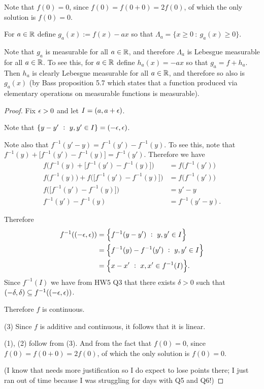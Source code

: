 Note that $f(0) = 0$, since $f(0) = f(0 + 0) = 2f(0)$, of which the only solution is $f(0) = 0$.

For $a \in \mathbb{R}$ define $g_a(x) := f(x) - ax$ so that $\Lambda_a = \{x \geq 0 ~:~ g_a(x) \geq 0\}$.

Note that $g_a$ is measurable for all $a \in \mathbb{R}$, and therefore $\Lambda_a$ is Lebesgue measurable for
all $a \in \mathbb{R}$. To see this, for $a \in \mathbb{R}$ define $h_a(x) = -ax$ so that $g_a = f + h_a$. Then $h_a$ is
clearly Lebesgue measurable for all $a \in \mathbb{R}$, and therefore so also is $g_a(x)$ (by Bass proposition 5.7
which states that a function produced via elementary operations on measurable functions is measurable).

\begin{proof}
  Fix $\epsilon > 0$ and let $I = (a, a + \epsilon)$.

  Note that $\{y - y' ~:~ y, y' \in I\} = (-\epsilon, \epsilon)$.

  Note also that $f^{-1}(y' - y) = f^{-1}(y') - f^{-1}(y)$. To see this, note
  that $f^{-1}(y) + \big[f^{-1}(y') - f^{-1}(y)\big] = f^{-1}(y')$. Therefore we have
  \begin{align*}
    f\Big(f^{-1}(y) + \big[f^{-1}(y') - f^{-1}(y)\big]\Big) &= f\big(f^{-1}(y')\big) \\
    f\Big(f^{-1}(y)\Big) + f\Big(\big[f^{-1}(y') - f^{-1}(y)\big]\Big) &= f\big(f^{-1}(y')\big) \\
    f\Big(\big[f^{-1}(y') - f^{-1}(y)\big]\Big) &= y' - y \\
    f^{-1}(y') - f^{-1}(y) &= f^{-1}(y' - y).
  \end{align*}

  Therefore
  \begin{align*}
    f^{-1}((-\epsilon, \epsilon))
    &= \Big\{f^{-1}(y - y') ~:~ y, y' \in I\Big\} \\
    &= \Big\{f^{-1}(y) - f^{-1}(y') ~:~ y, y' \in I\Big\} \\
    &= \Big\{x - x' ~:~ x, x' \in f^{-1}(I)\Big\}.
  \end{align*}
  Since $f^{-1}(I)$ we have from HW5 Q3 that there exists $\delta > 0$ such
  that $(-\delta, \delta) \subseteq f^{-1}((-\epsilon, \epsilon))$.

  Therefore $f$ is continuous.

  (3) Since $f$ is additive and continuous, it follows that it is linear.

  (1), (2) follow from (3). And from the fact that $f(0) = 0$, since $f(0) = f(0 + 0) = 2f(0)$, of which the only solution is $f(0) = 0$.

  (I know that needs more justification so I do expect to lose points there; I just ran out of time because I
  was struggling for days with Q5 and Q6!)
\end{proof}

